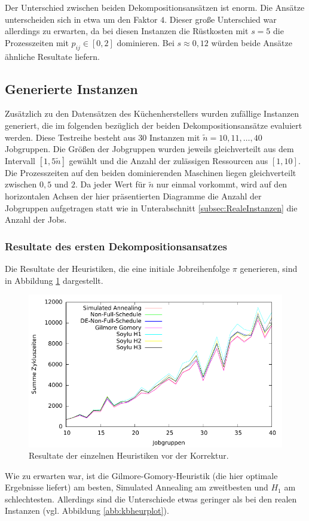 \documentclass{scrreprt}
\begin{document}
Der Unterschied zwischen beiden Dekompositionsansätzen ist enorm.
Die Ansätze unterscheiden sich in etwa um den Faktor $4$.
Dieser große Unterschied war allerdings zu erwarten, da bei diesen Instanzen die Rüstkosten mit $s=5$ die Prozesszeiten mit $p_{ij}\in [0,2]$ dominieren.
Bei $s\approx 0{,}12$ würden beide Ansätze ähnliche Resultate liefern.


\subsection{Generierte Instanzen}
\label{subsec:GenerierteInstanzen}
Zusätzlich zu den Datensätzen des Küchenherstellers wurden zufällige Instanzen generiert, die im folgenden bezüglich der beiden Dekompositionsansätze evaluiert werden.
Diese Testreihe besteht aus 30 Instanzen mit $\tilde{n}=10,11,\ldots,40$ Jobgruppen.
Die Größen der Jobgruppen wurden jeweils gleichverteilt aus dem Intervall $[1,5\tilde{n}]$ gewählt und die Anzahl der zulässigen Ressourcen aus $[1,10]$.
Die Prozesszeiten auf den beiden dominierenden Maschinen liegen gleichverteilt zwischen $0{,}5$ und $2$.
Da jeder Wert für $\tilde{n}$ nur einmal vorkommt, wird auf den horizontalen Achsen der hier präsentierten Diagramme die Anzahl der Jobgruppen aufgetragen
statt wie in Unterabschnitt \ref{subsec:RealeInstanzen} die Anzahl der Jobs.

\subsubsection{Resultate des ersten Dekompositionsansatzes}
Die Resultate der Heuristiken, die eine initiale Jobreihenfolge $\pi$ generieren, sind in Abbildung \ref{abb:heurplot} dargestellt.
\begin{figure}
    \begin{center}
        \includegraphics[width=.8\textwidth]{../prog/heuristics/plots/heurplot.pdf}
    \end{center}
    \caption{
        \label{abb:heurplot}
        Resultate der einzelnen Heuristiken vor der Korrektur.
    }
\end{figure}
Wie zu erwarten war, ist die Gilmore-Gomory-Heuristik (die hier optimale Ergebnisse liefert) am besten, Simulated Annealing am zweitbesten und $H_1$ am schlechtesten.
Allerdings sind die Unterschiede etwas geringer als bei den realen Instanzen (vgl. Abbildung \ref{abb:kbheurplot}).
\end{document}
